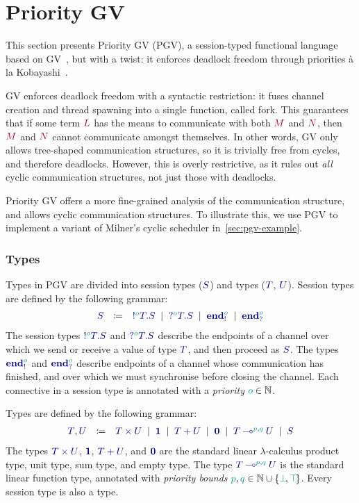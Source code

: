 \documentclass[main.tex]{subfiles}
\begin{document}
\section{Priority GV}\label{sec:pgv}

This section presents Priority GV (PGV), a session-typed functional language based on GV~\cite{wadler15,lindleymorris15}, but with a twist: it enforces deadlock freedom through priorities \`{a} la Kobayashi~\cite{kobayashi06,padovaninovara15}.

GV enforces deadlock freedom with a syntactic restriction: it fuses channel creation and thread spawning into a single function, called fork. This guarantees that if some term $\tm{L}$ has the means to communicate with both $\tm{M}$ and $\tm{N}$, then $\tm{M}$ and $\tm{N}$ cannot communicate amongst themselves. In other words, GV only allows tree-shaped communication structures, so it is trivially free from cycles, and therefore deadlocks. However, this is overly restrictive, as it rules out \emph{all} cyclic communication structures, not just those with deadlocks.

Priority GV offers a more fine-grained analysis of the communication structure, and allows cyclic communication structures. To illustrate this, we use PGV to implement a variant of Milner's cyclic scheduler in~\cref{sec:pgv-example}.

\subsubsection*{Types}
Types in PGV are divided into session types ($\ty{S}$) and types ($\ty{T}$, $\ty{U}$).
%
Session types are defined by the following grammar:
\[
\begin{array}{lcl}
  \ty{S}
  & \coloneqq & \ty{\tysend[\cs{o}]{T}{S}}
    \sep        \ty{\tyrecv[\cs{o}]{T}{S}}
    \sep        \ty{\tyends[\cs{o}]}
    \sep        \ty{\tyendr[\cs{o}]}
\end{array}
\]
The session types $\ty{\tysend[\cs{o}]{T}{S}}$ and $\ty{\tyrecv[\cs{o}]{T}{S}}$ describe the endpoints of a channel over which we send or receive a value of type $\ty{T}$, and then proceed as $\ty{S}$. The types $\ty{\tyends[\cs{o}]}$ and $\ty{\tyendr[\cs{o}]}$ describe endpoints of a channel whose communication has finished, and over which we must synchronise before closing the channel. Each connective in a session type is annotated with a \emph{priority} $\cs{o}\in\mathbb{N}$.

Types are defined by the following grammar:
\[
\begin{array}{lcl}
  \ty{T}, \ty{U}
  & \coloneqq & \ty{\typrod{T}{U}}
    \sep        \ty{\tyunit}
    \sep        \ty{\tysum{T}{U}}
    \sep        \ty{\tyvoid}
    \sep        \ty{\tylolli[\cs{p},\cs{q}]{T}{U}}
    \sep        \ty{S}
\end{array}
\]
The types $\ty{\typrod{T}{U}}$, $\ty{\tyunit}$, $\ty{\tysum{T}{U}}$, and $\ty{\tyvoid}$ are the standard linear $\lambda$-calculus product type, unit type, sum type, and empty type.
The type $\ty{\tylolli[\cs{p},\cs{q}]{T}{U}}$ is the standard linear function type, annotated with \emph{priority bounds} $\cs{p},\cs{q}\in\mathbb{N}\cup\{\cs{\pbot},\cs{\ptop}\}$.
Every session type is also a type.
\end{document}
